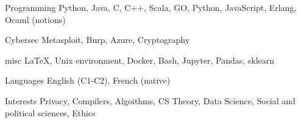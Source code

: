 


\begin{cvskills}
	
	
	\cvskill
	{Programming} %
	{Python, Java, C, C++, Scala, GO, Python, JavaScript, Erlang, Ocaml (notions)} %
	
	
	\cvskill
	{Cybersec} %
	{Metasploit, Burp, Azure, Cryptography} %
	
	
	\cvskill
	{misc} %
	{\LaTeX, Unix environment, Docker, Bash, Jupyter, Pandas, sklearn} %
	
	
	\cvskill
	{Languages} %
	{English (C1-C2), French (native)} %
	
	
	\cvskill
	{Interests} %
	{Privacy, Compilers, Algoithms, CS Theory, Data Science, Social and political sciences, Ethics} %
	
	
\end{cvskills}